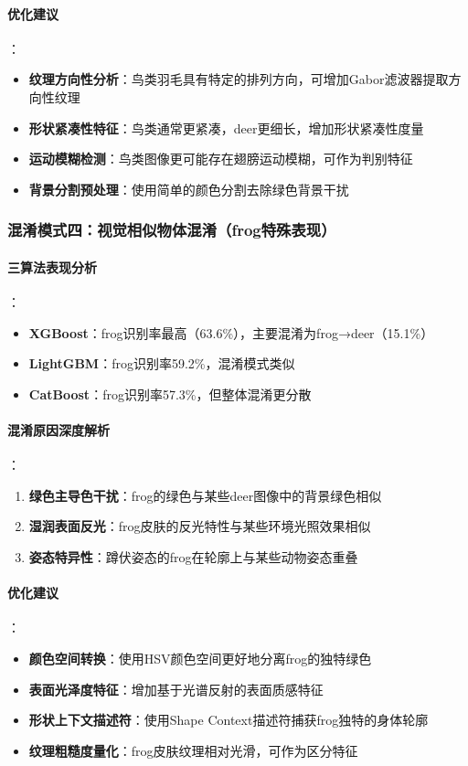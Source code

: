 \documentclass[UTF8]{report}
\theoremstyle{MyLineTheoremStyle} %
\theoremstyle{MyBlockTheoremStyle} %
\theoremstyle{MySubsubsectionStyle} %
\begin{document}
\paragraph{优化建议}：
\begin{itemize}
    \item \textbf{纹理方向性分析}：鸟类羽毛具有特定的排列方向，可增加Gabor滤波器提取方向性纹理
    \item \textbf{形状紧凑性特征}：鸟类通常更紧凑，deer更细长，增加形状紧凑性度量
    \item \textbf{运动模糊检测}：鸟类图像更可能存在翅膀运动模糊，可作为判别特征
    \item \textbf{背景分割预处理}：使用简单的颜色分割去除绿色背景干扰
\end{itemize}

\subsubsection{混淆模式四：视觉相似物体混淆（frog特殊表现）}
\paragraph{三算法表现分析}：
\begin{itemize}
    \item \textbf{XGBoost}：frog识别率最高（63.6\%），主要混淆为frog→deer（15.1\%）
    \item \textbf{LightGBM}：frog识别率59.2\%，混淆模式类似
    \item \textbf{CatBoost}：frog识别率57.3\%，但整体混淆更分散
\end{itemize}
\paragraph{混淆原因深度解析}：
\begin{enumerate}
    \item \textbf{绿色主导色干扰}：frog的绿色与某些deer图像中的背景绿色相似
    \item \textbf{湿润表面反光}：frog皮肤的反光特性与某些环境光照效果相似
    \item \textbf{姿态特异性}：蹲伏姿态的frog在轮廓上与某些动物姿态重叠
\end{enumerate}
\paragraph{优化建议}：
\begin{itemize}
    \item \textbf{颜色空间转换}：使用HSV颜色空间更好地分离frog的独特绿色
    \item \textbf{表面光泽度特征}：增加基于光谱反射的表面质感特征
    \item \textbf{形状上下文描述符}：使用Shape Context描述符捕获frog独特的身体轮廓
    \item \textbf{纹理粗糙度量化}：frog皮肤纹理相对光滑，可作为区分特征
\end{itemize}
\end{document}
